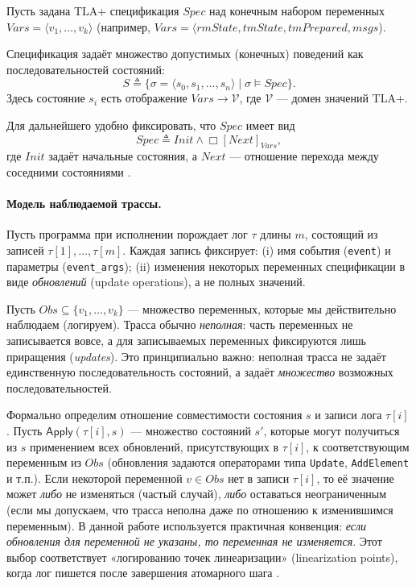 Пусть задана TLA+ спецификация $\mathit{Spec}$ над конечным набором переменных
$Vars = \langle v_1, \dots, v_k \rangle$ (например, $Vars = \langle rmState,
tmState, tmPrepared, msgs$).


Спецификация задаёт
множество допустимых (конечных) поведений как последовательностей состояний:
\[
  S \triangleq \{ \sigma = \langle s_0, s_1, \dots, s_n \rangle \mid \sigma \models \mathit{Spec} \}.
\]
Здесь состояние $s_i$ есть отображение $Vars \to \mathcal{V}$, где
$\mathcal{V}$ --- домен значений TLA+.

Для дальнейшего удобно фиксировать, что $\mathit{Spec}$ имеет вид
\[
\mathit{Spec} \triangleq \mathit{Init} \wedge \Box[\mathit{Next}]_{Vars},
\]
где $\mathit{Init}$ задаёт начальные состояния, а $\mathit{Next}$ --- отношение
перехода между соседними состояниями \cite{LamportSpecifyingSystems2002}.

\paragraph{Модель наблюдаемой трассы.}
Пусть программа при исполнении порождает лог $\tau$ длины $m$,
состоящий из записей $\tau[1],\dots,\tau[m]$. Каждая запись фиксирует:
(i) имя события (\texttt{event}) и параметры (\texttt{event\_args});
(ii) изменения некоторых переменных спецификации в виде \emph{обновлений}
(update operations), а не полных значений.

Пусть $Obs \subseteq \{v_1,\dots,v_k\}$ --- множество переменных, которые
мы действительно наблюдаем (логируем). Трасса обычно \emph{неполная}:
часть переменных не записывается вовсе, а для записываемых переменных
фиксируются лишь приращения (\emph{updates}). Это принципиально важно:
неполная трасса не задаёт единственную последовательность состояний,
а задаёт \emph{множество} возможных последовательностей.

Формально определим отношение совместимости состояния $s$ и записи лога $\tau[i]$.
Пусть $\mathsf{Apply}(\tau[i], s)$ --- множество состояний $s'$, которые могут
получиться из $s$ применением всех обновлений, присутствующих в $\tau[i]$,
к соответствующим переменным из $Obs$ (обновления задаются операторами
типа \texttt{Update}, \texttt{AddElement} и т.п.).
Если некоторой переменной $v \in Obs$ нет в записи $\tau[i]$,
то её значение может \emph{либо} не изменяться (частый случай),
\emph{либо} оставаться неограниченным (если мы допускаем, что трасса
неполна даже по отношению к изменившимся переменным). В данной работе
используется практичная конвенция: \emph{если обновления для переменной не
указаны, то переменная не изменяется}. Этот выбор соответствует
«логированию точек линеаризации» (linearization points), когда лог пишется
после завершения атомарного шага \cite{CirsteaKuppeLoillierMerz2024}.

